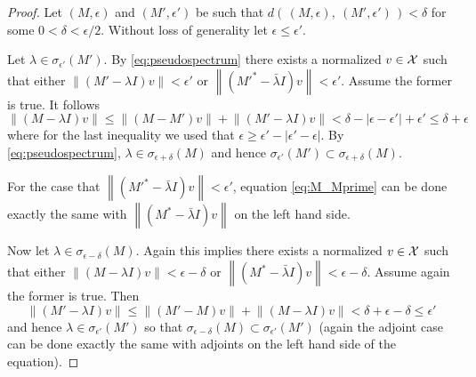 \begin{proof}
    Let $(M, \epsilon)$ and $(M', \epsilon')$ be such that 
    $d\left(\, (M, \epsilon),\ (M', \epsilon') \,\right) < \delta$ for some 
    $0 < \delta < \epsilon / 2$. Without loss of generality let 
    $\epsilon \leq \epsilon'$. 
    
    Let $\lambda \in \sigma_{\epsilon'} (M')$. By 
    \ref{eq:pseudospectrum} there exists a normalized $v \in \mathcal{X}$ such that 
    either $\left\| (M' - \lambda I) v \right\| < \epsilon'$ or 
    $\left\| (M'^* - \bar{\lambda} I) v \right\| < \epsilon'$. Assume the former is true. 
    It follows
    \begin{equation}
        \label{eq:M_Mprime}
        \left\| (M - \lambda I) v \right\| 
        \leq \left\| (M - M') v \right\| + \left\| (M' - \lambda I) v \right\|
        < \delta - \left| \epsilon - \epsilon' \right| + \epsilon'
        \leq \delta + \epsilon
    \end{equation}
    where for the last inequality we used that 
    $\epsilon \geq \epsilon' - \left| \epsilon' - \epsilon \right|$. By 
    \ref{eq:pseudospectrum}, $\lambda \in \sigma_{\epsilon + \delta} (M)$ and hence 
    $\sigma_{\epsilon'} (M') \subset \sigma_{\epsilon + \delta} (M)$. 
    
    For the case that 
    $\left\| (M'^* - \bar{\lambda} I) v \right\| < \epsilon'$, equation \ref{eq:M_Mprime} 
    can be done exactly the same with $\left\| (M^* - \bar{\lambda} I) v \right\|$ on 
    the left hand side. 

    Now let $\lambda \in \sigma_{\epsilon - \delta} (M)$. Again this implies there exists 
    a normalized $v \in \mathcal{X}$ such that either 
    $\left\| (M - \lambda I) v \right\| < \epsilon - \delta$ or 
    $\left\| (M^* - \bar{\lambda} I) v \right\| < \epsilon - \delta$. Assume again the 
    former is true. Then 
    \begin{equation}
        \left\| (M' - \lambda I) v \right\| 
        \leq \left\| (M' - M) v \right\| + \left\| (M - \lambda I) v \right\|
        < \delta + \epsilon - \delta
        \leq \epsilon'
    \end{equation}
    and hence $\lambda \in \sigma_{\epsilon'} (M')$ so that 
    $\sigma_{\epsilon - \delta} (M) \subset \sigma_{\epsilon'} (M')$ (again the adjoint 
    case can be done exactly the same with adjoints on the left hand side of the equation). 


\end{proof}
